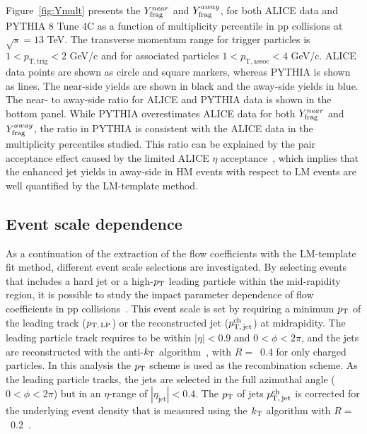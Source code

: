 Figure~\ref{fig:Ymult} presents the $Y^{near}_{\rm{frag}}$ and $Y^{away}_{\rm{frag}}$, for both ALICE data and PYTHIA 8 Tune 4C as a function of multiplicity percentile in pp collisions at $\sqrt{s}=13$ TeV. The transverse momentum range for trigger particles is $1<p_\mathrm{T,trig}<2$ GeV/c and for associated particles $1<p_\mathrm{T,assoc}<4$ GeV/c. ALICE data points are shown as circle and square markers, whereas PYTHIA is shown as lines. The near-side yields are shown in black and the away-side yields in blue.
The near- to away-side ratio for ALICE and PYTHIA data is shown in the bottom panel. While PYTHIA overestimates ALICE data for both $Y^{near}_{\rm{frag}}$ and $Y^{away}_{\rm{frag}}$, the ratio in PYTHIA is consistent with the ALICE data in the multiplicity percentiles studied. This ratio can be explained by the pair acceptance effect caused by the limited ALICE $\eta$ acceptance~\cite{PHENIX:2006gto}, which implies that the enhanced jet yields in away-side in HM events with respect to LM events are well quantified by the LM-template method.

\subsection{Event scale dependence}
As a continuation of the extraction of the flow coefficients with the LM-template fit method, different event scale selections are investigated. By selecting events that includes a hard jet or a high-$p_\mathrm{T}$ leading particle within the mid-rapidity region, it is possible to study the impact parameter dependence of flow coefficients in pp collisions~\cite{Sjostrand:1986ep,Frankfurt:2010ea}. This event scale is set by requiring a minimum $p_\mathrm{T}$ of the leading track ($p_\mathrm{T,\,LP}$) or the reconstructed jet ($p_\mathrm{T,\,jet}^\mathrm{ch}$) at midrapidity. The leading particle track requires to be within $|\eta|<0.9$ and $0<\phi<2\pi$, and the jets are reconstructed with the anti-$k_{\rm{T}}$ algorithm~\cite{Cacciari:2008gp,Cacciari:2011ma}, with $R=$~0.4 for only charged particles. In this analysis the $p_\mathrm{T}$ scheme is used as the recombination scheme. As the leading particle tracks, the jets are selected in the full azimuthal angle ($0<\phi<2\pi$) but in an $\eta$-range of $|\eta_\mathrm{jet}|<0.4$. The $p_\mathrm{T}$ of jets $p_\mathrm{T,\,jet}^\mathrm{ch}$ is corrected for the underlying event density that is measured using the $k_{\rm{T}}$ algorithm with $R=$~0.2~\cite{Acharya:2018eat}.





